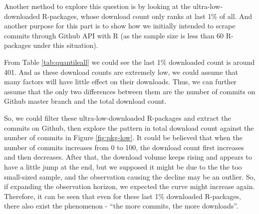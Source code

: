 \documentclass[
]{book}
\begin{document}
Another method to explore this question is by looking at the ultra-low-downloaded R-packages, whose download count only ranks at last 1\% of all. And another purpose for this part is to show how we initially intended to scrape commits through Github API with R (as the sample size is less than 60 R-packages under this situation).

From Table \ref{tab:quantileall} we could see the last 1\% downloaded count is around 401. And as these download counts are extremely low, we could assume that many factors will have little effect on their downloads. Thus, we can further assume that the only two differences between them are the number of commits on Github master branch and the total download count.

So, we could filter these ultra-low-downloaded R-packages and extract the commits on Github, then explore the pattern in total download count against the number of commits in Figure \ref{fig:pkg-low}. It could be believed that when the number of commits increases from 0 to 100, the download count first increases and then decreases. After that, the download volume keeps rising and appears to have a little jump at the end, but we supposed it might be due to the the too small-sized sample, and the observation causing the decline may be an outlier. So, if expanding the observation horizon, we expected the curve might increase again. Therefore, it can be seen that even for these last 1\% downloaded R-packages, there also exist the phenomenon - ``the more commits, the more downloads''.
\end{document}
